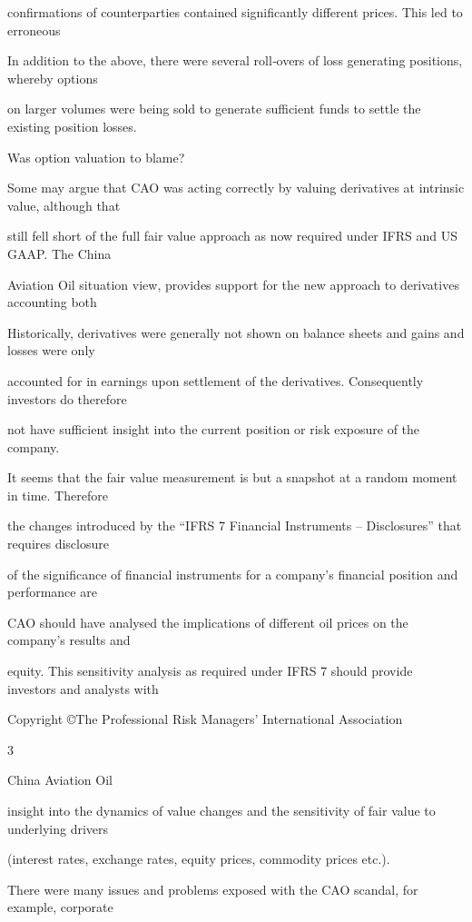 confirmations of counterparties contained significantly different prices. This led to erroneous

In addition to the above, there were several roll‐overs of loss generating positions, whereby options

on larger volumes were being sold to generate sufficient funds to settle the existing position losses.

Was option valuation to blame?

Some may argue that CAO was acting correctly by valuing derivatives at intrinsic value, although that

still fell short of the full fair value approach as now required under IFRS and US GAAP. The China

Aviation Oil situation view, provides support for the new approach to derivatives accounting both

Historically, derivatives were generally not shown on balance sheets and gains and losses were only

accounted for in earnings upon settlement of the derivatives. Consequently investors do therefore

not have sufficient insight into the current position or risk exposure of the company.

It seems that the fair value measurement is but a snapshot at a random moment in time. Therefore

the changes introduced by the “IFRS 7 Financial Instruments – Disclosures” that requires disclosure

of the significance of financial instruments for a company’s financial position and performance are

CAO should have analysed the implications of different oil prices on the company’s results and

equity. This sensitivity analysis as required under IFRS 7 should provide investors and analysts with

Copyright ©The Professional Risk Managers’ International Association 

3

    China Aviation Oil

insight into the dynamics of value changes and the sensitivity of fair value to underlying drivers

(interest rates, exchange rates, equity prices, commodity prices etc.).

There were many issues and problems exposed with the CAO scandal, for example, corporate

